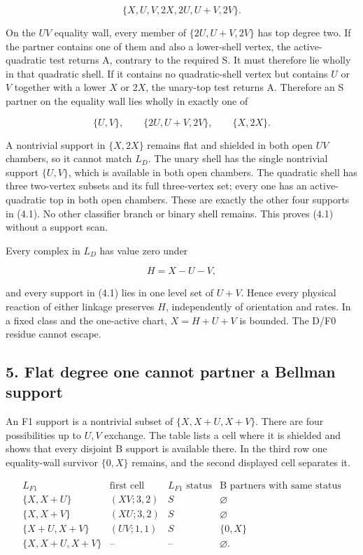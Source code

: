 \[
                   \{X,U,V,2X,2U,U+V,2V\}.             \tag{4.2}
\]

On the \(UV\) equality wall, every member of \(\{2U,U+V,2V\}\) has top
degree two. If the partner contains one of them and also a lower-shell
vertex, the active-quadratic test returns A, contrary to the required S.
It must therefore lie wholly in that quadratic shell. If it contains no
quadratic-shell vertex but contains \(U\) or \(V\) together with a lower
\(X\) or \(2X\), the unary-top test returns A. Therefore an S partner on
the equality wall lies wholly in exactly one of

\[
              \{U,V\},\qquad\{2U,U+V,2V\},\qquad\{X,2X\}. \tag{4.3}
\]

A nontrivial support in \(\{X,2X\}\) remains flat and shielded in both
open \(UV\) chambers, so it cannot match \(L_D\). The unary shell has
the single nontrivial support \(\{U,V\}\), which is available in both
open chambers. The quadratic shell has three two-vertex subsets and its
full three-vertex set; every one has an active-quadratic top in both
open chambers. These are exactly the other four supports in (4.1). No
other classifier branch or binary shell remains. This proves (4.1)
without a support scan.

Every complex in \(L_D\) has value zero under

\[
                              H=X-U-V,                  \tag{4.4}
\]

and every support in (4.1) lies in one level set of \(U+V\). Hence every
physical reaction of either linkage preserves \(H\), independently of
orientation and rates. In a fixed class and the one-active chart,
\(X=H+U+V\) is bounded. The D/F0 residue cannot escape.

\subsection{5. Flat degree one cannot partner a Bellman
support}

An F1 support is a nontrivial subset of \(\{X,X+U,X+V\}\). There are
four possibilities up to \(U,V\) exchange. The table lists a cell where
it is shielded and shows that every disjoint B support is available
there. In the third row one equality-wall survivor \(\{0,X\}\) remains,
and the second displayed cell separates it.

\[
\begin{array}{c|c|c|c}
L_{F1}&\text{first cell}&L_{F1}\text{ status}
                       &\text{B partners with same status}\\ \hline
\{X,X+U\}&(XV;3,2)&S&\varnothing\\
\{X,X+V\}&(XU;3,2)&S&\varnothing\\
\{X+U,X+V\}&(UV;1,1)&S&\{0,X\}\\
\{X,X+U,X+V\}&\text{--}&\text{--}&\varnothing .
\end{array}                                             \tag{5.1}
\]

